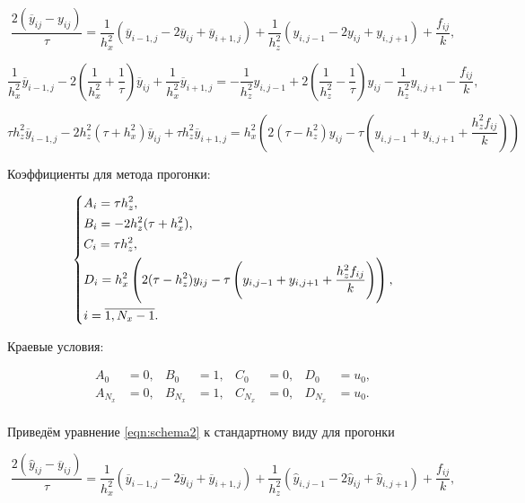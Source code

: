 \documentclass[12pt, a4paper]{article}
\begin{document}
\begin{equation}
	\frac{2(\overline y_{ij} - y_{ij})}{\tau} = \frac{1}{h_x^2} (\overline y_{i - 1, j} - 2\overline y_{ij} + \overline y_{i + 1, j}) + \frac{1}{h_z^2} (y_{i, j - 1} - 2y_{ij} + y_{i, j + 1}) + \frac{f_{ij}}k,
\end{equation}

\begin{equation}
	\frac{1}{h_x^2}\overline y_{i - 1, j} - 2 \left(\frac1{h_x^2} + \frac1\tau \right)\overline y_{ij} + \frac{1}{h_x^2}\overline y_{i + 1, j}
	= -\frac{1}{h_z^2}y_{i, j - 1} + 2\left(\frac1{h_z^2} - \frac1\tau\right)y_{ij} - \frac{1}{h_z^2}y_{i, j + 1} - \frac{f_{ij}}k,
\end{equation}

\begin{equation}
	\tau h_z^2 \overline y_{i - 1, j} - 2h_z^2(\tau + h_x^2)\overline y_{ij} + \tau h_z^2 \overline y_{i + 1, j}
	= h_x^2 \left( 2(\tau - h_z^2)y_{ij} - \tau \left( y_{i, j - 1} + y_{i, j + 1} + \frac{h_z^2 f_{ij}}k \right) \right)
\end{equation}

Коэффициенты для метода прогонки:

\begin{equation}
	\begin{dcases}
		A_i = \tau h_z^2, \\
		B_i = -2h_z^2(\tau + h_x^2), \\
		C_i = \tau h_z^2, \\
		D_i = h_x^2 \left( 2(\tau - h_z^2)y_{ij} - \tau \left( y_{i, j - 1} + y_{i, j + 1} + \frac{h_z^2 f_{ij}}k \right) \right), \\
		i = \overline{1, N_x - 1}. \\
	\end{dcases}
\end{equation}

Краевые условия:

\begin{equation}
	\begin{aligned}
		A_0     &= 0, & B_0     &= 1, & C_0     &= 0, & D_0     &= u_0, \\
		A_{N_x} &= 0, & B_{N_x} &= 1, & C_{N_x} &= 0, & D_{N_x} &= u_0. \\
	\end{aligned}
\end{equation}


Приведём уравнение \eqref{eqn:schema2} к стандартному виду для прогонки

\begin{equation}
	\frac{2(\hat y_{ij} - \overline y_{ij})}{\tau} = \frac{1}{h_x^2} (\overline y_{i - 1, j} - 2\overline y_{ij} + \overline y_{i + 1, j}) + \frac{1}{h_z^2} (\hat y_{i, j - 1} - 2\hat y_{ij} + \hat y_{i, j + 1}) + \frac{f_{ij}}k,
\end{equation}
\end{document}
